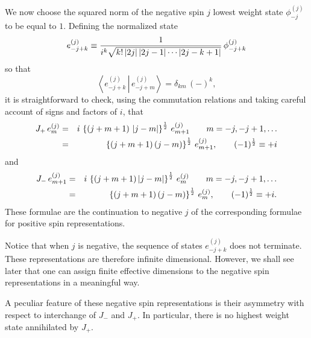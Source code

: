 \documentclass[a4paper,dvips,12pt]{article}
\newcommand {\half} {{1 \over 2}}
\newcommand {\braket}[2] {\left< { \left. #1 \,\right|} \,#2 \right>}
\begin{document}
    We now choose the squared norm of the negative spin
    $j$ lowest weight state $\phi_{-j}^{(j)}$ to be equal to $1$.  Defining
    the normalized state
    \begin{equation}
        e_{-j+k}^{(j)} \equiv {1\over i^k\sqrt {k! \, |2j|\,|2j -
        1|\cdots|2j-k+1|}}
                \,\phi_{-j + k}^{(j)}
    \end{equation}
    so that
    \begin{equation}
        \braket{e_{-j+k}^{(j)}} {e_{-j+m}^{(j)}} = \delta_{km}\, (-)^{k},
        \label{INNERPROD}
    \end{equation}
    it is straightforward to check, using the commutation relations and
    taking careful account of signs and
    factors of $i$, that
    \begin{eqnarray}
        J_+  \,e_m^{(j)} &= &i\,\left\{ \left(j + m + 1\right)\,\left|j -
                m\right|\right\}^{\half}\,e_{m+1}^{(j)}
                \qquad m = -j, -j+1, \dots\nonumber\\
                &= &\phantom{i}\left\{ (j + m + 1)\,(j -
                m)\right\}^{\half}\,e_{m+1}^{(j)},\qquad (-1)^{\half} \equiv
                +i
                \label{JPLUSACTION}
    \end{eqnarray}
    and
    \begin{eqnarray}
        J_- \,e_{m+1}^{(j)} &= &i\,\left\{ (j + m + 1)\,|j -
                m|\right\}^{\half}\,e_{m}^{(j)}
                \qquad m = -j, -j+1, \dots\nonumber\\
                &= &\phantom{i}\left\{ (j + m + 1)\,(j -
                m)\right\}^{\half}\,e_{m}^{(j)},\qquad (-1)^{\half} \equiv
                +i.
                \label{JMINUSACTION}
    \end{eqnarray}
    These formulae are the continuation to negative $j$ of the
    corresponding formulae for positive spin representations.

    Notice that when $j$ is negative, the
    sequence of states $e_{-j + k}^{(j)}$ does not terminate.  These
    representations are therefore infinite dimensional.  However,
    we shall see later that one can assign finite effective
    dimensions
    to the negative spin representations in a meaningful way.

    A peculiar feature of these negative spin representations is their asymmetry with
    respect to interchange of $J_-$ and $J_+$.  In particular,
    there is no highest weight state annihilated by
    $J_+$.
\end{document}
